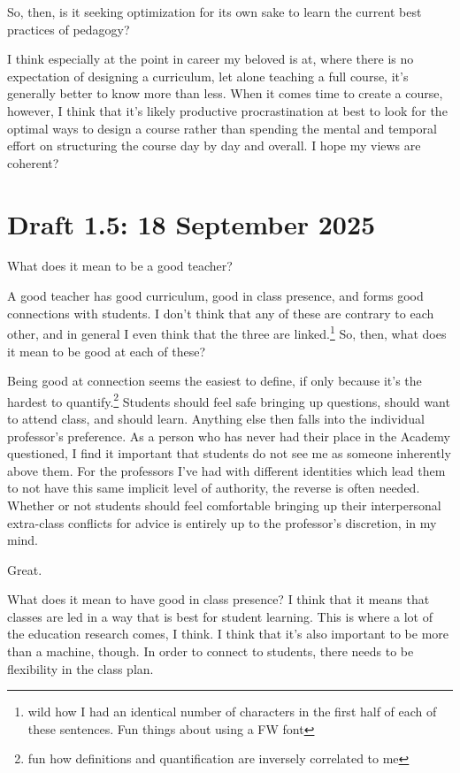 \documentclass[12pt]{article}
\renewcommand{\,}{\textsuperscript{,}}
\begin{document}
So, then, is it seeking optimization for its own sake to learn the current best practices of pedagogy?

I think especially at the point in career my beloved is at, where there is no expectation of designing a curriculum, let alone teaching a full course, it's generally better to know more than less.
When it comes time to create a course, however, I think that it's likely productive procrastination at best to look for the optimal ways to design a course rather than spending the mental and temporal effort on structuring the course day by day and overall.
I hope my views are coherent?

\section{Draft 1.5: 18 September 2025}
What does it mean to be a good teacher?

A good teacher has good curriculum, good in class presence, and forms good connections with students.
I don't think that any of these are contrary to each other, and in general I even think that the three are linked.\footnote{wild how I had an identical number of characters in the first half of each of these sentences. Fun things about using a FW font}
So, then, what does it mean to be good at each of these?

Being good at connection seems the easiest to define, if only because it's the hardest to quantify.\footnote{fun how definitions and quantification are inversely correlated to me}
Students should feel safe bringing up questions, should want to attend class, and should learn.
Anything else then falls into the individual professor's preference.
As a person who has never had their place in the Academy questioned, I find it important that students do not see me as someone inherently above them.
For the professors I've had with different identities which lead them to not have this same implicit level of authority, the reverse is often needed.
Whether or not students should feel comfortable bringing up their interpersonal extra-class conflicts for advice is entirely up to the professor's discretion, in my mind.

Great.

What does it mean to have good in class presence?
I think that it means that classes are led in a way that is best for student learning.
This is where a lot of the education research comes, I think.
I think that it's also important to be more than a machine, though.
In order to connect to students, there needs to be flexibility in the class plan.
\end{document}

